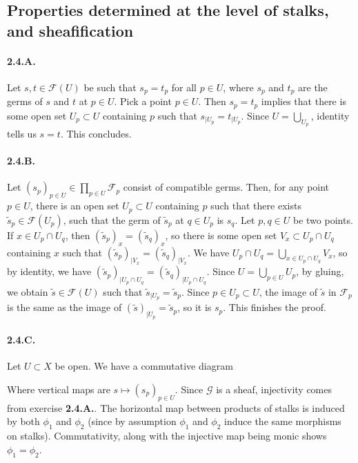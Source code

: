 \documentclass{article}
\newcommand{\Fsheaf}{\mathscr{F}}
\newcommand{\Gsheaf}{\mathscr{G}}
\begin{document}
\subsection{Properties determined at the level of stalks, and sheafification}

\paragraph{2.4.A.} Let $s,t \in \Fsheaf(U)$ be such that $s_p = t_p$ for all $p \in U$, where $s_p$ and $t_p$ are the germs of $s$ and $t$ at $p \in U$. Pick a point $p \in U$. Then $s_p = t_p$ implies that there is some open set $U_p \subset U$ containing $p$ such that $s_{\mid U_p} = t_{\mid U_p}$. Since $U = \bigcup_{U_p}$, identity tells us $s = t$. This concludes.

\paragraph{2.4.B.} Let $(s_p)_{p \in U} \in \prod_{p \in U} \Fsheaf_p$ consist of compatible germs. Then, for any point $p \in U$, there is an open set $U_p \subset U$ containing $p$ such that there exists $\tilde{s}_p \in \Fsheaf(U_p)$, such that the germ of $\tilde{s}_p$ at $q \in U_p$ is $s_q$. Let $p,q \in U$ be two points. If $x \in U_p \cap U_q$, then $(\tilde{s}_p)_x = (\tilde{s}_q)_x$, so there is some open set $V_x \subset U_p \cap U_q$ containing $x$ such that $(\tilde{s}_p)_{\mid V_x} =(\tilde{s}_q)_{\mid V_x}$. We have $U_p \cap U_q = \bigcup_{x \in U_p \cap U_q} V_x$, so by identity, we have $(\tilde{s}_p)_{\mid U_p \cap U_q} = (\tilde{s}_q)_{\mid U_p \cap U_q}$. Since $U = \bigcup_{p \in U} U_p$, by gluing, we obtain $\tilde{s} \in \Fsheaf(U)$ such that $\tilde{s}_{\mid U_p} = \tilde{s}_p$. Since $p \in U_p \subset U$, the image of $\tilde{s}$ in $\Fsheaf_p$ is the same as the image of $(\tilde{s})_{\mid U_p} = \tilde{s}_p$, so it is $s_p$. This finishes the proof.

\paragraph{2.4.C.} Let $U \subset X$ be open. We have a commutative diagram
\begin{center}
\end{center}
Where vertical maps are $s \mapsto (s_p)_{p \in U}$. Since $\Gsheaf$ is a sheaf, injectivity comes from exercise \textbf{2.4.A.}. The horizontal map between products of stalks is induced by both $\phi_1$ and $\phi_2$ (since by assumption $\phi_1$ and $\phi_2$ induce the same morphisms on stalks). Commutativity, along with the injective map being monic shows $\phi_1 = \phi_2$.
\end{document}

